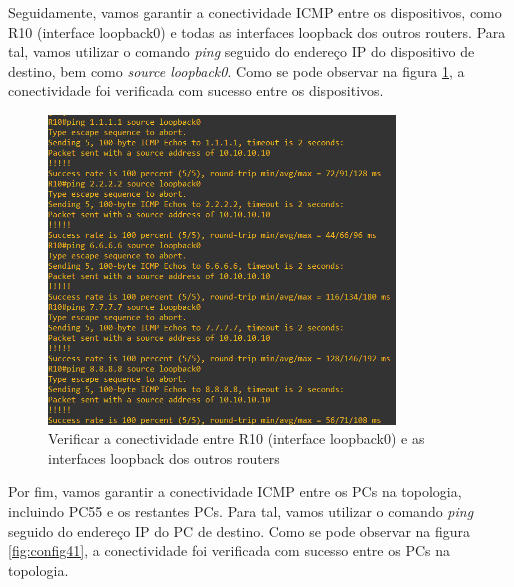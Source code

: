 \documentclass[11pt,english, openright, oneside]{book}
\begin{document}
\par Seguidamente, vamos garantir a conectividade ICMP entre os dispositivos, como R10 (interface loopback0) e todas as interfaces loopback dos outros routers. Para tal, vamos utilizar o comando \textit{ping} seguido do endereço IP do dispositivo de destino, bem como \textit{source loopback0}. Como se pode observar na figura \ref{fig:config40}, a conectividade foi verificada com sucesso entre os dispositivos.
\vspace{0.2cm}

\begin{figure}[H]
  \centering
  \includegraphics[width=0.82\textwidth]{imagens/Tarefa4/23.ping_R10_loopback0.png}
  \caption{Verificar a conectividade entre R10 (interface loopback0) e as interfaces loopback dos outros routers}
  \label{fig:config40}
\end{figure}
\vspace{0.2cm}

\par Por fim, vamos garantir a conectividade ICMP entre os PCs na topologia, incluindo PC55 e os restantes PCs. Para tal, vamos utilizar o comando \textit{ping} seguido do endereço IP do PC de destino. Como se pode observar na figura \ref{fig:config41}, a conectividade foi verificada com sucesso entre os PCs na topologia.
\vspace{0.2cm}
\end{document}
